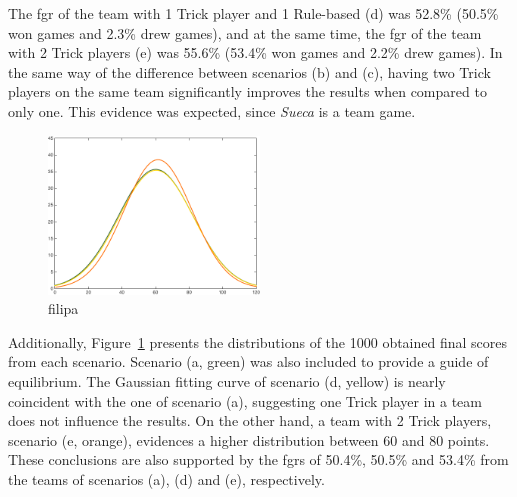 The \ac{fgr} of the team with 1 Trick player and 1 Rule-based (d) was 52.8\% (50.5\% won games and 2.3\% drew games), and at the same time, the \ac{fgr} of the team with 2 Trick players (e) was 55.6\% (53.4\% won games and 2.2\% drew games).
In the same way of the difference between scenarios (b) and (c), having two Trick players on the same team significantly improves the results when compared to only one.
This evidence was expected, since \emph{Sueca} is a team game.

\begin{figure}[h!]
  \centering
    \includegraphics[width=0.5\textwidth]{./img/5/ADE}
  \caption{filipa}
\label{fig:ADE}
\end{figure}

Additionally, Figure~\ref{fig:ADE} presents the distributions of the 1000 obtained final scores from each scenario.
Scenario (a, green) was also included to provide a guide of equilibrium.
The Gaussian fitting curve of scenario (d, yellow) is nearly coincident with the one of scenario (a), suggesting one Trick player in a team does not influence the results.
On the other hand, a team with 2 Trick players, scenario (e, orange), evidences a higher distribution between 60 and 80 points.
These conclusions are also supported by the \acp{fgr} of 50.4\%, 50.5\% and 53.4\% from the teams of scenarios (a), (d) and (e), respectively.

